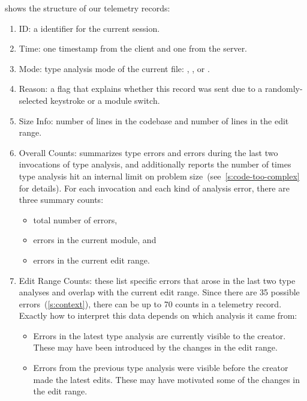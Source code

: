 \documentclass[english,submission,cleveref]{programming}
\begin{document}
 shows the structure of our telemetry records:
\begin{enumerate}
  \item
    ID: a \panon{} identifier for the current session.
  \item
    Time: one timestamp from the client and one from the server.
  \item
    Mode: type analysis mode of the current file: \mnocheck{},
    \mnonstrict{}, or \mstrict{}.
  \item
    Reason: a flag that explains whether this record was sent due to a
    randomly-selected keystroke or a module switch.
  \item
    Size Info: number of lines in the codebase and number of lines in the edit range.
  \item
    Overall Counts: summarizes type errors and \FS{} errors during the
    last two invocations of type analysis, and additionally reports the number
    of times type analysis hit an internal limit on problem
    size~(see~\cref{s:code-too-complex} for details).
    For each invocation and each kind of
    analysis error, there are three summary counts:
    \begin{itemize}
      \item total number of errors,
      \item errors in the current module, and
      \item errors in the current edit range.
    \end{itemize}
  \item
    Edit Range Counts: these list specific errors that arose in the last two
    type analyses and overlap with the current edit range.
    Since there are 35 possible errors~(\cref{s:context}), there can be up to 70 counts
    in a telemetry record.
    Exactly how to interpret this data depends on which analysis it came from:
    \begin{itemize}
      \item
        Errors in the latest type analysis are currently visible to the
        creator.
        These may have been introduced by the changes in the edit range.
      \item
        Errors from the previous type analysis were visible before the creator
        made the latest edits.
        These may have motivated some of the changes in the edit range.
    \end{itemize}
\end{enumerate}
\end{document}
